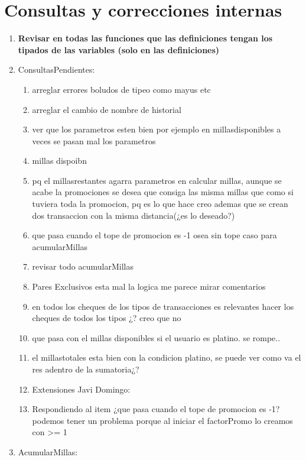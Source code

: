 \documentclass[11pt,a4paper]{article}
\begin{document}
\section{Consultas y correcciones internas}
\vspace{1.0cm}

\begin{enumerate}
	\item \textbf{Revisar en todas las funciones que las definiciones tengan los tipados de las variables (solo en las definiciones)}
	\item ConsultasPendientes:
	      \begin{enumerate}
			\item arreglar errores boludos de tipeo como mayus etc
			\item arreglar el cambio de nombre de historial
			\item ver que los parametros esten bien por ejemplo en millasdisponibles a veces se pasan mal los parametros
			\item millas dispoibn
			\item pq el millasrestantes agarra  parametros en calcular millas, aunque se acabe la promociones se desea que consiga las misma millas que como si tuviera toda la promocion, pq es lo que hace creo ademas que se crean dos transaccion con la misma distancia(¿es lo deseado?)
			\item que pasa cuando el tope de promocion es -1 osea sin tope caso para acumularMillas
			\item revisar todo acumularMillas
			\item Pares Exclusivos esta mal la logica me parece mirar comentarios
			\item en todos los cheques de los tipos de transacciones es relevantes hacer los cheques de todos los tipos ¿? creo que no
			\item que pasa con el millas disponibles si el usuario es platino. se rompe..
			\item el millastotales esta bien con la condicion platino, se puede ver como va el res adentro de la sumatoria¿?
			\item Extensiones Javi Domingo:
			\item Respondiendo al item ¿que pasa cuando el tope de promocion es -1? podemos tener un problema porque al iniciar el factorPromo lo creamos con >= 1
	      \end{enumerate}
	\item AcumularMillas:
	      \begin{enumerate}

\end{enumerate}
\end{enumerate}
\end{document}
